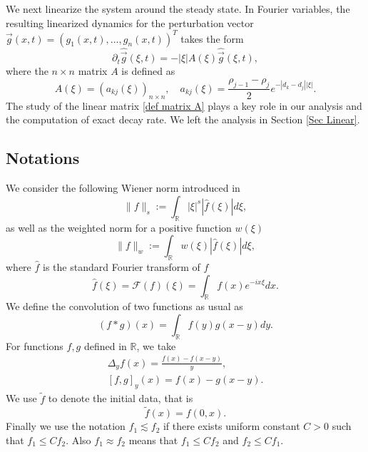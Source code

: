 \documentclass[11pt]{article}
\theoremstyle{definition}
\numberwithin{equation}{section}
\begin{document}
We next linearize the system around the steady state. In Fourier variables, the resulting linearized dynamics for the perturbation vector $\vec{g}(x,t)=(g_1(x,t),\dots,g_n(x,t))^{T}$ takes the form
\begin{equation}
    \partial_t\hat{\vec{g}}(\xi,t)=-|\xi|A(\xi)\hat{\vec{g}}(\xi,t),
\end{equation}
where the $n\times n$ matrix $A$ is defined as
\begin{equation}\label{def matrix A}
    A(\xi)=\left(a_{kj}(\xi)\right)_{n\times n},\quad a_{kj}(\xi)=\frac{\rho_{j-1}-\rho_j}{2}e^{-|d_k-d_j||\xi|}.
\end{equation}
The study of the linear matrix \eqref{def matrix A} plays a key role in our analysis and the computation of exact decay rate. We left the analysis in Section \ref{Sec Linear}.

\subsection{Notations}
We consider the following Wiener norm introduced in \cite{Constantin2010OnTG}
\begin{equation*}
    \|f\|_s:=\int_{\mathbb{R}}|\xi|^s|\hat{f}(\xi)|d\xi,
\end{equation*}
as well as the weighted norm for a positive function $w(\xi)$
\begin{equation}
    \|f\|_w:=\int_{\mathbb{R}}w(\xi)|\hat{f}(\xi)|d\xi,
\end{equation}
where $\hat{f}$ is the standard Fourier transform of $f$
\begin{equation*}
    \hat{f}(\xi)=\mathscr{F}(f)(\xi)=\int_{\mathbb{R}}f(x)e^{- ix\xi}dx.
\end{equation*}
We define the convolution of two functions as usual as
\begin{equation*}
    (f*g)(x)=\int_{\mathbb{R}}f(y)g(x-y)dy.
\end{equation*}
For functions $f,g$ defined in $\mathbb{R}$, we take
\begin{equation}\label{eq_notation_Delta}
    \begin{aligned}
        \Delta_yf(x)=\frac{f(x)-f(x-y)}{y},\\
        [f,g]_y(x)=f(x)-g(x-y).
    \end{aligned}
\end{equation}
We use $\tilde{f}$ to denote the initial data, that is
\begin{equation}
    \tilde{f}(x)=f(0,x).
\end{equation}
Finally we use the notation $f_1\lesssim f_2$ if there exists uniform constant $C>0$ such that $f_1\leq Cf_2$. Also $f_1\approx f_2$ means that $f_1\leq Cf_2$ and $f_2\leq Cf_1$.
\end{document}

